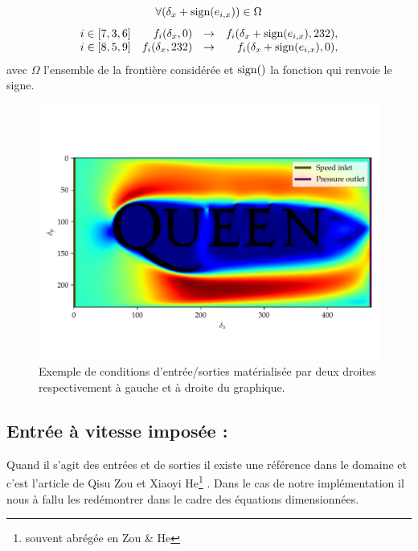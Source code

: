     $$
      \forall (\delta_x + \text{sign}(e_{i,x})) \in \Omega
    $$
    \begin{equation}     
      \begin{array}{rrcr}
        i \in [7,3,6] & f_i(\delta_x, 0) & \rightarrow & f_i(\delta_x + \text{sign}(e_{i,x}), 232),\\
        i \in [8,5,9] & f_i(\delta_x, 232) & \rightarrow & f_i(\delta_x + \text{sign}(e_{i,x}), 0),
      \end{array}
    \end{equation}
     avec $\Omega$ l'ensemble de la frontière considérée et $\text{sign}()$ la fonction qui renvoie le signe.



    \begin{figure}[hbtp]
      \centering
      \includegraphics[width=\linewidth]{iolet.pdf}
      \caption{Exemple de conditions d'entrée/sorties matérialisée par deux droites respectivement à gauche et à droite 
      du graphique.}
      \label{fig:iolet}    
    \end{figure}

  \subsection{\bf Entrée à vitesse imposée :}
    Quand il s'agit des entrées et de sorties il existe une référence dans le domaine et c'est l'article de
    Qisu Zou et Xiaoyi He\footnote{souvent abrégée en Zou \& He} \cite{Zou_1997}.
    Dans le cas de notre implémentation il nous à fallu les redémontrer dans le cadre des équations dimensionnées.
    
